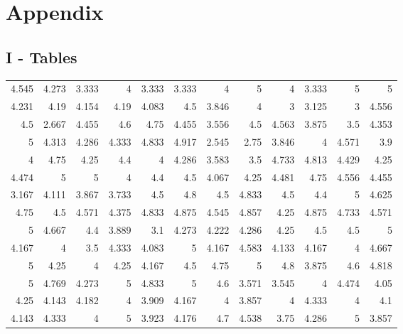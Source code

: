 \documentclass[10pt]{report}
\begin{document}
\newpage
\section*{Appendix}

\subsection*{I - Tables}

\begin{table}[!htpb]
    \centering

	\begin{tabular}{rrrrrrrrrrrr}
	\hline
	4.545 & 4.273 & 3.333 & 4     & 3.333 & 3.333 & 4     & 5     & 4     & 3.333 & 5     & 5     \\
	4.231 & 4.19  & 4.154 & 4.19  & 4.083 & 4.5   & 3.846 & 4     & 3     & 3.125 & 3     & 4.556 \\
	4.5   & 2.667 & 4.455 & 4.6   & 4.75  & 4.455 & 3.556 & 4.5   & 4.563 & 3.875 & 3.5   & 4.353 \\
	5     & 4.313 & 4.286 & 4.333 & 4.833 & 4.917 & 2.545 & 2.75  & 3.846 & 4     & 4.571 & 3.9   \\
	4     & 4.75  & 4.25  & 4.4   & 4     & 4.286 & 3.583 & 3.5   & 4.733 & 4.813 & 4.429 & 4.25  \\
	4.474 & 5     & 5     & 4     & 4.4   & 4.5   & 4.067 & 4.25  & 4.481 & 4.75  & 4.556 & 4.455 \\
	3.167 & 4.111 & 3.867 & 3.733 & 4.5   & 4.8   & 4.5   & 4.833 & 4.5   & 4.4   & 5     & 4.625 \\
	4.75  & 4.5   & 4.571 & 4.375 & 4.833 & 4.875 & 4.545 & 4.857 & 4.25  & 4.875 & 4.733 & 4.571 \\
	5     & 4.667 & 4.4   & 3.889 & 3.1   & 4.273 & 4.222 & 4.286 & 4.25  & 4.5   & 4.5   & 5     \\
	4.167 & 4     & 3.5   & 4.333 & 4.083 & 5     & 4.167 & 4.583 & 4.133 & 4.167 & 4     & 4.667 \\
	5     & 4.25  & 4     & 4.25  & 4.167 & 4.5   & 4.75  & 5     & 4.8   & 3.875 & 4.6   & 4.818 \\
	5     & 4.769 & 4.273 & 5     & 4.833 & 5     & 4.6   & 3.571 & 3.545 & 4     & 4.474 & 4.05  \\
	4.25  & 4.143 & 4.182 & 4     & 3.909 & 4.167 & 4     & 3.857 & 4     & 4.333 & 4     & 4.1   \\
	4.143 & 4.333 & 4     & 5     & 3.923 & 4.176 & 4.7   & 4.538 & 3.75  & 4.286 & 5     & 3.857 \\

\end{tabular}
\end{table}
\end{document}
